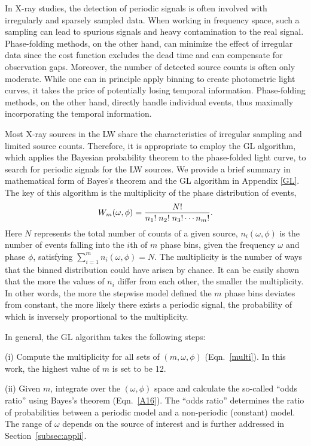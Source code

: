 \documentclass[fleqn,usenatbib]{mnras}
\begin{document}
In X-ray studies, the detection of periodic signals is often involved with irregularly and sparsely sampled data. 
When working in frequency space, such a sampling can lead to spurious signals and heavy contamination to the real signal. Phase-folding methods, on the other hand, can minimize the effect of irregular data since the cost function excludes the dead time and can compensate for observation gaps.
Moreover, the number of detected source counts is often only moderate. While one can in principle apply binning to create photometric light curves, it takes the price of potentially losing temporal information. Phase-folding methods, on the other hand, directly handle individual events, thus maximally incorporating the temporal information.

Most X-ray sources in the LW share the characteristics of irregular sampling and limited source counts. 
Therefore, it is appropriate to employ the GL algorithm, which applies the Bayesian probability theorem to the phase-folded light curve, to search for periodic signals for the LW sources. We provide a brief summary in mathematical form of Bayes's theorem and the GL algorithm in Appendix \ref{GL}. 
The key of this algorithm is the multiplicity of the phase distribution of events,
\begin{equation}\label{multi}
W_m(\omega, \phi)={{N!}\over{n_1!\; n_2!\; n_3!\cdots {n_m}!}}.
\end{equation}
Here $N$ represents the total number of counts of a given source, 
$n_i(\omega, \phi)$ is the number of events falling into the $i$th of $m$ phase bins, given the frequency $\omega$ and phase $\phi$, satisfying $\sum\limits_{i=1}^{m}n_i(\omega, \phi)=N$. 
The multiplicity is the number of ways that the binned distribution could have arisen by chance. It can be easily shown that the more the values of $n_i$ differ from each other, the smaller the multiplicity. In other words, the more the stepwise model defined the $m$ phase bins deviates from constant, the more likely there exists a periodic signal, the probability of which is inversely proportional to the multiplicity.  

In general, the GL algorithm takes the following steps:

(i) Compute the multiplicity for all sets of $(m,\omega, \phi)$ (Eqn.~\ref{multi}). In this work, the highest value of $m$ is set to be 12.

(ii) Given $m$, integrate over the $(\omega, \phi)$ space and calculate the so-called ``odds ratio'' using Bayes's theorem (Eqn.~\ref{A16}). The ``odds ratio'' determines the ratio of probabilities between a periodic model and a non-periodic (constant) model. The range of $\omega$ depends on the source of interest and is further addressed in Section~\ref{subsec:appli}.
\end{document}
